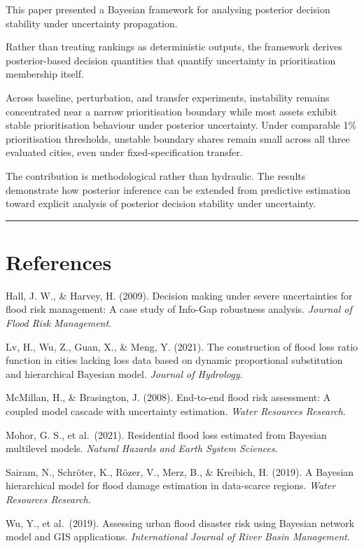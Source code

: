 \documentclass[
]{article}
\begin{document}
This paper presented a Bayesian framework for analysing posterior
decision stability under uncertainty propagation.

Rather than treating rankings as deterministic outputs, the framework
derives posterior-based decision quantities that quantify uncertainty in
prioritisation membership itself.

Across baseline, perturbation, and transfer experiments, instability
remains concentrated near a narrow prioritisation boundary while most
assets exhibit stable prioritisation behaviour under posterior
uncertainty. Under comparable 1\% prioritisation thresholds, unstable
boundary shares remain small across all three evaluated cities, even
under fixed-specification transfer.

The contribution is methodological rather than hydraulic. The results
demonstrate how posterior inference can be extended from predictive
estimation toward explicit analysis of posterior decision stability
under uncertainty.

\begin{center}\rule{0.5\linewidth}{0.5pt}\end{center}

\section{References}\label{references}

Hall, J. W., \& Harvey, H. (2009). Decision making under severe
uncertainties for flood risk management: A case study of Info-Gap
robustness analysis. \emph{Journal of Flood Risk Management}.

Lv, H., Wu, Z., Guan, X., \& Meng, Y. (2021). The construction of flood
loss ratio function in cities lacking loss data based on dynamic
proportional substitution and hierarchical Bayesian model. \emph{Journal
of Hydrology}.

McMillan, H., \& Brasington, J. (2008). End-to-end flood risk
assessment: A coupled model cascade with uncertainty estimation.
\emph{Water Resources Research}.

Mohor, G. S., et al.~(2021). Residential flood loss estimated from
Bayesian multilevel models. \emph{Natural Hazards and Earth System
Sciences}.

Sairam, N., Schröter, K., Rözer, V., Merz, B., \& Kreibich, H. (2019). A
Bayesian hierarchical model for flood damage estimation in data-scarce
regions. \emph{Water Resources Research}.

Wu, Y., et al.~(2019). Assessing urban flood disaster risk using
Bayesian network model and GIS applications. \emph{International Journal
of River Basin Management}.
\end{document}
